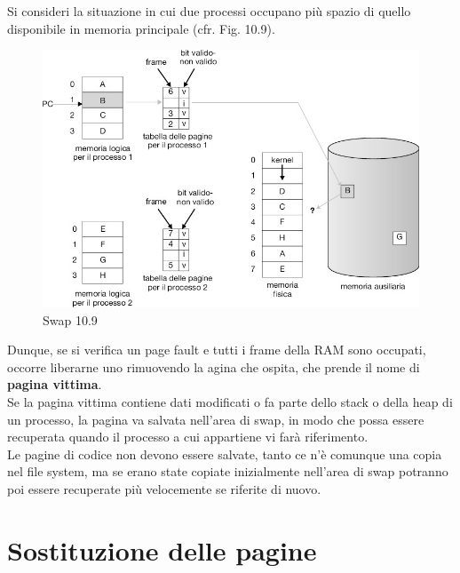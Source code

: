 Si consideri la situazione in cui due processi occupano più spazio di quello disponibile in memoria principale (cfr. Fig. 10.9).
\begin{figure}[h] \centering \includegraphics[width=0.5\linewidth]{images/swap_disegno.png} \caption{Swap 10.9} \label{fig:10.9} \end{figure}
Dunque, se si verifica un page fault e tutti i frame della RAM sono occupati, occorre liberarne uno rimuovendo la
agina che ospita, che prende il nome di \textbf{pagina vittima}.\\
Se la pagina vittima contiene dati modificati o fa parte dello stack o della heap di un processo, la pagina va salvata nell’area di swap, in modo che possa essere recuperata quando il processo a cui appartiene vi farà riferimento.\\
Le pagine di codice non devono essere salvate, tanto ce n’è comunque una copia nel file system, ma se erano state copiate inizialmente nell’area di swap potranno poi essere recuperate più velocemente se riferite di nuovo.\\


\section{Sostituzione delle pagine}


